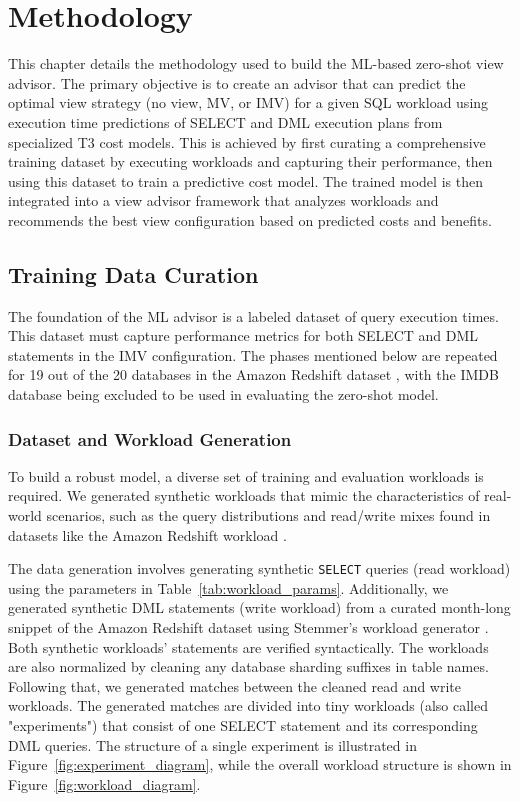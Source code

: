 \chapter{Methodology}
\label{chap:methodology}

This chapter details the methodology used to build the \ac{ML}-based zero-shot view advisor. The primary objective is to create an advisor that can predict the optimal view strategy (no view, \ac{MV}, or \ac{IMV}) for a given SQL workload using execution time predictions of SELECT and \ac{DML} execution plans from specialized \ac{T3} cost models. This is achieved by first curating a comprehensive training dataset by executing workloads and capturing their performance, then using this dataset to train a predictive cost model. The trained model is then integrated into a view advisor framework that analyzes workloads and recommends the best view configuration based on predicted costs and benefits.

\section{Training Data Curation}
\label{sec:data_curation}
The foundation of the \ac{ML} advisor is a labeled dataset of query execution times. This dataset must capture performance metrics for both SELECT and \ac{DML} statements in the \ac{IMV} configuration. The phases mentioned below are repeated for 19 out of the 20 databases in the Amazon Redshift dataset \cite{gupta2015amazon}, with the IMDB database being excluded to be used in evaluating the zero-shot model.

\subsection{Dataset and Workload Generation}
\label{sec:dataset_generation}
To build a robust model, a diverse set of training and evaluation workloads is required. We generated synthetic workloads that mimic the characteristics of real-world scenarios, such as the query distributions and read/write mixes found in datasets like the Amazon Redshift workload \cite{gupta2015amazon}.

The data generation involves generating synthetic \texttt{SELECT} queries (read workload) using the parameters in Table~\ref{tab:workload_params}. Additionally, we generated synthetic \ac{DML} statements (write workload) from a curated month-long snippet of the Amazon Redshift dataset using Stemmer's workload generator \cite{Stemmer2025}. Both synthetic workloads' statements are verified syntactically. The workloads are also normalized by cleaning any database sharding suffixes in table names. Following that, we generated matches between the cleaned read and write workloads. The generated matches are divided into tiny workloads (also called "experiments") that consist of one SELECT statement and its corresponding \ac{DML} queries. The structure of a single experiment is illustrated in Figure~\ref{fig:experiment_diagram}, while the overall workload structure is shown in Figure~\ref{fig:workload_diagram}. 

